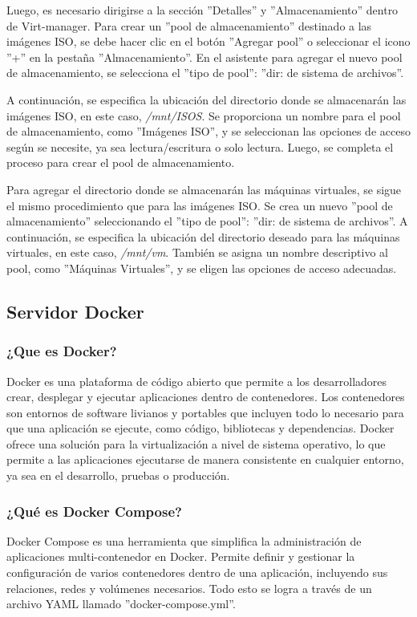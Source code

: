 		Luego, es necesario dirigirse a la sección ''Detalles'' y ''Almacenamiento'' dentro de Virt-manager. Para crear un ''pool de almacenamiento'' destinado a las imágenes ISO, se debe hacer clic en el botón ''Agregar pool'' o seleccionar el icono ''+'' en la pestaña ''Almacenamiento''. En el asistente para agregar el nuevo pool de almacenamiento, se selecciona el ''tipo de pool'': ''dir: de sistema de archivos''.
		
		A continuación, se especifica la ubicación del directorio donde se almacenarán las imágenes ISO, en este caso, \textit{/mnt/ISOS}. Se proporciona un nombre para el pool de almacenamiento, como ''Imágenes ISO'', y se seleccionan las opciones de acceso según se necesite, ya sea lectura/escritura o solo lectura. Luego, se completa el proceso para crear el pool de almacenamiento.
		
		Para agregar el directorio donde se almacenarán las máquinas virtuales, se sigue el mismo procedimiento que para las imágenes ISO. Se crea un nuevo ''pool de almacenamiento'' seleccionando el ''tipo de pool'': ''dir: de sistema de archivos''. A continuación, se especifica la ubicación del directorio deseado para las máquinas virtuales, en este caso, \textit{/mnt/vm}. También se asigna un nombre descriptivo al pool, como ''Máquinas Virtuales'', y se eligen las opciones de acceso adecuadas.
	
		\subsection{Servidor Docker}
		
			\subsubsection{¿Que es Docker?}
	
				Docker es una plataforma de código abierto que permite a los desarrolladores crear, desplegar y ejecutar aplicaciones dentro de contenedores. Los contenedores son entornos de software livianos y portables que incluyen todo lo necesario para que una aplicación se ejecute, como código, bibliotecas y dependencias. Docker ofrece una solución para la virtualización a nivel de sistema operativo, lo que permite a las aplicaciones ejecutarse de manera consistente en cualquier entorno, ya sea en el desarrollo, pruebas o producción.
		
			\subsubsection{¿Qué es Docker Compose?}
				Docker Compose es una herramienta que simplifica la administración de aplicaciones multi-contenedor en Docker. Permite definir y gestionar la configuración de varios contenedores dentro de una aplicación, incluyendo sus relaciones, redes y volúmenes necesarios. Todo esto se logra a través de un archivo YAML llamado ''docker-compose.yml''. 
				
